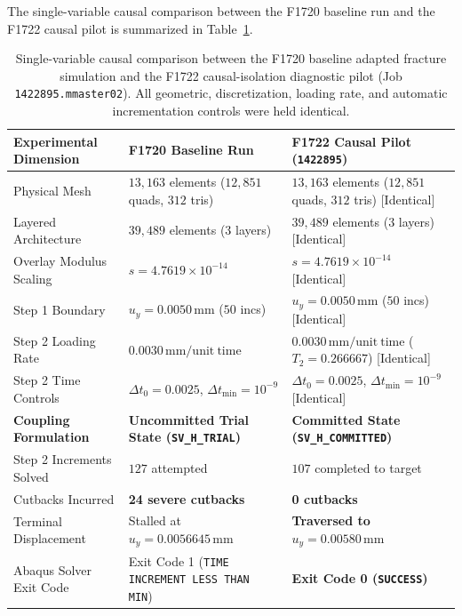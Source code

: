 The single-variable causal comparison between the F1720 baseline run and the F1722 causal pilot is summarized in Table~\ref{tab:f1720_vs_f1722_comparison}.

\begin{table}[htbp]
\centering
\small
\caption{Single-variable causal comparison between the F1720 baseline adapted fracture simulation and the F1722 causal-isolation diagnostic pilot (Job \texttt{1422895.mmaster02}). All geometric, discretization, loading rate, and automatic incrementation controls were held identical.}
\label{tab:f1720_vs_f1722_comparison}
\begin{tabularx}{\textwidth}{lXX}
\hline
\textbf{Experimental Dimension} & \textbf{F1720 Baseline Run} & \textbf{F1722 Causal Pilot (\texttt{1422895})} \\
\hline
Physical Mesh & $13{,}163$ elements ($12{,}851$ quads, $312$ tris) & $13{,}163$ elements ($12{,}851$ quads, $312$ tris) [Identical] \\
Layered Architecture & $39{,}489$ elements ($3$ layers) & $39{,}489$ elements ($3$ layers) [Identical] \\
Overlay Modulus Scaling & $s = 4.7619 \times 10^{-14}$ & $s = 4.7619 \times 10^{-14}$ [Identical] \\
Step 1 Boundary & $u_y = 0.0050\,\mathrm{mm}$ ($50$ incs) & $u_y = 0.0050\,\mathrm{mm}$ ($50$ incs) [Identical] \\
Step 2 Loading Rate & $0.0030\,\mathrm{mm}/\mathrm{unit\ time}$ & $0.0030\,\mathrm{mm}/\mathrm{unit\ time}$ ($T_2 = 0.266667$) [Identical] \\
Step 2 Time Controls & $\Delta t_0 = 0.0025$, $\Delta t_{\min} = 10^{-9}$ & $\Delta t_0 = 0.0025$, $\Delta t_{\min} = 10^{-9}$ [Identical] \\
\textbf{Coupling Formulation} & \textbf{Uncommitted Trial State (\texttt{SV\_H\_TRIAL})} & \textbf{Committed State (\texttt{SV\_H\_COMMITTED})} \\
Step 2 Increments Solved & $127$ attempted & $107$ completed to target \\
Cutbacks Incurred & \textbf{24 severe cutbacks} & \textbf{0 cutbacks} \\
Terminal Displacement & Stalled at $u_y = 0.0056645\,\mathrm{mm}$ & \textbf{Traversed to $u_y = 0.00580\,\mathrm{mm}$} \\
Abaqus Solver Exit Code & Exit Code 1 (\texttt{TIME INCREMENT LESS THAN MIN}) & \textbf{Exit Code 0 (\texttt{SUCCESS})} \\
\hline
\end{tabularx}
\end{table}

